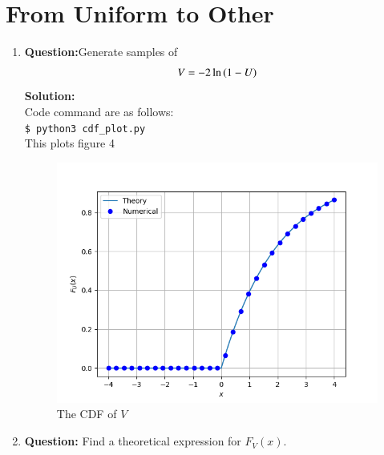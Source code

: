\documentclass[journal,12pt,twocolumn]{IEEEtran}
\begin{document}
\section{From Uniform to Other}

\begin{enumerate}[label=\thesection.\arabic*
,ref=\thesection.\theenumi]
\item\textbf{Question:}Generate samples of\\
%
\begin{align}
V = -2\ln\left(1-U\right)
\end{align}
\noindent \textbf{Solution: }\\
Code command are as follows:\\
\texttt{\$ python3 cdf\_plot.py}\\
This plots figure 4\\
\begin{figure}[!ht]
\centering
\includegraphics[width=\columnwidth]{./figs/Figure_Q4.png}
\caption{The CDF of $V$}
\label{fig:CDF_V}
\end{figure}





\item\textbf{Question:}
Find a theoretical expression for $F_V(x)$.


\end{enumerate}
\end{document}
